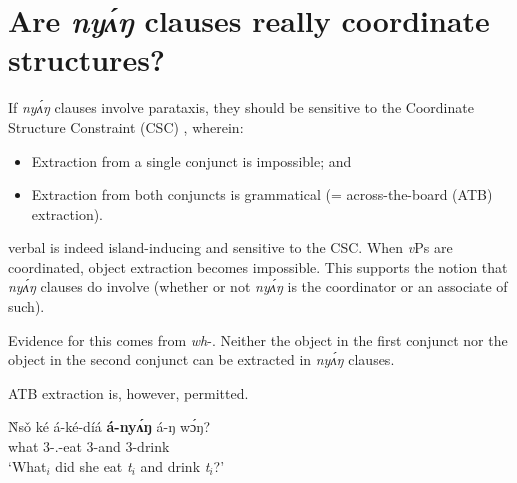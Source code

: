 \documentclass[output=paper,modfonts,nonflat,
hidelinks
]{langsci/langscibook}
\begin{document}
\section{Are \textit{ny\'{ʌ}ŋ} clauses really coordinate structures?}\label{sec:duncan-et-al:4}

If  \textit{ny\'{ʌ}ŋ} clauses involve parataxis, they should be sensitive to the Coordinate Structure Constraint (CSC) \citep{ross1967constraints}, wherein:

\begin{itemize}
\item Extraction from a single conjunct is impossible; and
\item Extraction from both conjuncts is grammatical (= across-the-board (ATB) extraction).
\end{itemize}

\noindent {} verbal  is indeed island-inducing and sensitive to the CSC. When \textit{v}Ps are coordinated, object extraction becomes impossible. This supports the notion that \textit{ny\'{ʌ}ŋ} clauses do involve  (whether or not \textit{ny\'{ʌ}ŋ} is the coordinator or an associate of such).

Evidence for this comes from \textit{wh}-. Neither the object in the first conjunct nor the object in the second conjunct can be extracted in \textit{ny\'{ʌ}ŋ} clauses.

\ea\label{ex:duncan-et-al:13}
\z
\z

\noindent ATB extraction is, however, permitted.

\ea\label{ex:duncan-et-al:14}
\gll \`{N}s\v{o} ké á-ké-díá \textbf{á-ny\'{ʌ}ŋ} á-ŋ w\'ɔŋ? \\
what {\FOC} 3{\SG-\PST.\FOC}-eat 3{\SG}-and 3{\SG}-drink \\
\glt `What$_i$ did she eat \textit{t}$_i$ and drink \textit{t}$_i$?'
\z
\end{document}

